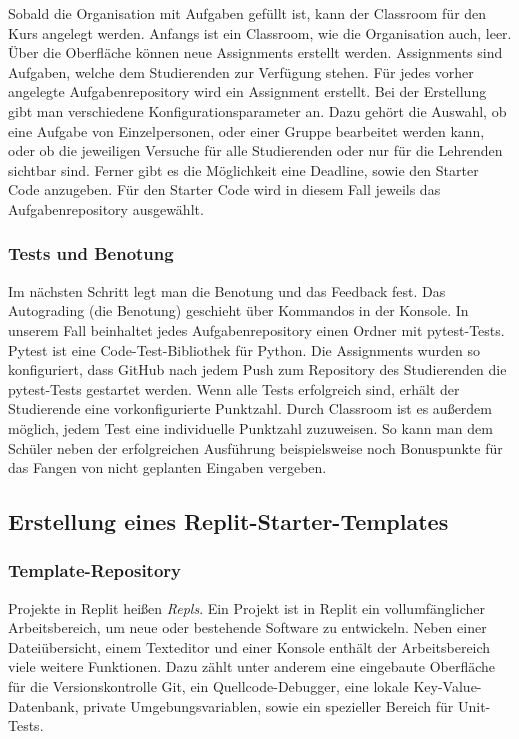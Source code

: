Sobald die Organisation mit Aufgaben gefüllt ist, kann der
Classroom für den Kurs angelegt werden. Anfangs ist ein Classroom, wie die
Organisation auch, leer. Über die Oberfläche können neue Assignments
erstellt werden. Assignments sind Aufgaben, welche dem Studierenden zur
Verfügung stehen. Für jedes vorher angelegte Aufgabenrepository wird ein
Assignment erstellt. Bei der Erstellung gibt man verschiedene
Konfigurationsparameter an. Dazu gehört die Auswahl, ob eine Aufgabe von
Einzelpersonen, oder einer Gruppe bearbeitet werden kann, oder ob die jeweiligen
Versuche für alle Studierenden oder nur für die Lehrenden sichtbar sind. Ferner
gibt es die Möglichkeit eine Deadline, sowie den Starter Code anzugeben. Für den
Starter Code wird in diesem Fall jeweils das Aufgabenrepository ausgewählt.
\parencite{github-assignment-erstellen}

\subsubsection{Tests und Benotung}\label{classroom-tests}
Im nächsten Schritt legt man die Benotung und das Feedback fest. Das Autograding
(die Benotung) geschieht über Kommandos in der Konsole. In unserem Fall
beinhaltet jedes Aufgabenrepository einen Ordner mit pytest-Tests. Pytest ist
eine Code-Test-Bibliothek für Python. Die Assignments wurden so konfiguriert,
dass GitHub nach jedem Push zum Repository des Studierenden die pytest-Tests
gestartet werden. Wenn alle Tests erfolgreich sind, erhält der Studierende eine
vorkonfigurierte Punktzahl. Durch Classroom ist es außerdem möglich, jedem
Test eine individuelle Punktzahl zuzuweisen. So kann man dem Schüler neben der
erfolgreichen Ausführung beispielsweise noch Bonuspunkte für das Fangen von
nicht geplanten Eingaben vergeben. \parencite{github-assignment-erstellen}

\newpage

\subsection{Erstellung eines Replit-Starter-Templates}\label{replit-template}
\subsubsection{Template-Repository}\label{replit-template-repository}
Projekte in Replit heißen \emph{Repls}. Ein Projekt ist in Replit ein
vollumfänglicher Arbeitsbereich, um neue oder bestehende Software zu entwickeln.
Neben einer Dateiübersicht, einem Texteditor und einer Konsole enthält der
Arbeitsbereich viele weitere Funktionen. Dazu zählt unter anderem eine
eingebaute Oberfläche für die Versionskontrolle Git, ein Quellcode-Debugger,
eine lokale Key-Value-Datenbank, private Umgebungsvariablen, sowie ein
spezieller Bereich für Unit-Tests.

